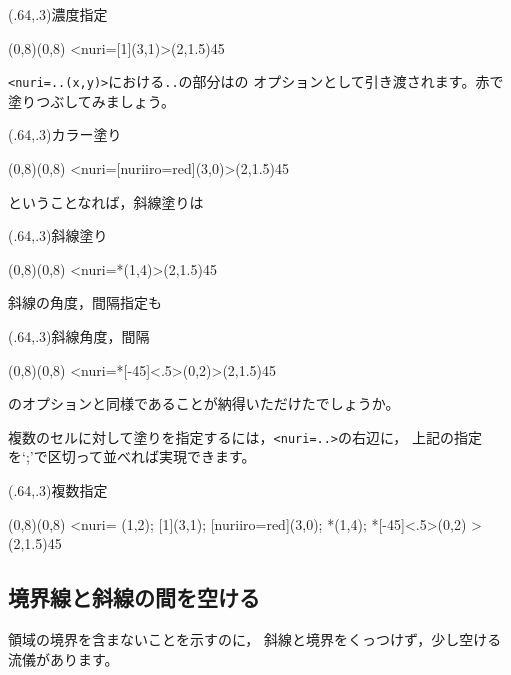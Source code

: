 \begin{showEx}(.64,.3){濃度指定}
\begin{zahyou*}[ul=4mm](0,8)(0,8)
\kousi<nuri={[1](3,1)}>(2,1.5){4}{5}
\end{zahyou*}
\end{showEx}

\verb+<nuri=..(x,y)>+における\verb+..+の部分はの
オプションとして引き渡されます。赤で塗りつぶしてみましょう。

\begin{showEx}(.64,.3){カラー塗り}
\begin{zahyou*}[ul=4mm](0,8)(0,8)
\kousi<nuri={[nuriiro=red](3,0)}>(2,1.5){4}{5}
\end{zahyou*}
\end{showEx}

\noindent
ということなれば，斜線塗りは

\begin{showEx}(.64,.3){斜線塗り}
\begin{zahyou*}[ul=4mm](0,8)(0,8)
\kousi<nuri={*(1,4)}>(2,1.5){4}{5}
\end{zahyou*}
\end{showEx}

斜線の角度，間隔指定も

\begin{showEx}(.64,.3){斜線角度，間隔}
\begin{zahyou*}[ul=4mm](0,8)(0,8)
\kousi<nuri={*[-45]<.5>(0,2)}>(2,1.5){4}{5}
\end{zahyou*}
\end{showEx}

のオプションと同様であることが納得いただけたでしょうか。

複数のセルに対して塗りを指定するには，\verb+<nuri=..>+の右辺に，
上記の指定を`;'で区切って並べれば実現できます。

\begin{showEx}(.64,.3){複数指定}
\begin{zahyou*}[ul=4mm](0,8)(0,8)
\kousi<nuri={%
  (1,2);%
  [1](3,1);%
  [nuriiro=red](3,0);%
  *(1,4);%
  *[-45]<.5>(0,2)%
}>(2,1.5){4}{5}
\end{zahyou*}
\end{showEx}


\subsection{境界線と斜線の間を空ける}
領域の境界を含まないことを示すのに，
斜線と境界をくっつけず，少し空ける流儀があります。

